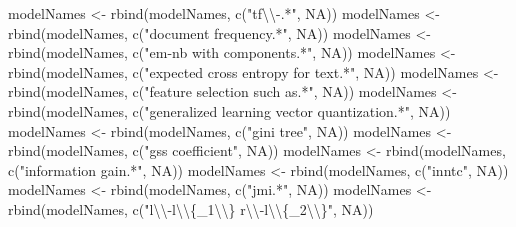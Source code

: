 \documentclass[
]{article}
\newenvironment{Shaded}{\begin{snugshade}}{\end{snugshade}}
\newcommand{\ConstantTok}[1]{\textcolor[rgb]{0.00,0.00,0.00}{#1}}
\newcommand{\FunctionTok}[1]{\textcolor[rgb]{0.00,0.00,0.00}{#1}}
\newcommand{\NormalTok}[1]{#1}
\newcommand{\OtherTok}[1]{\textcolor[rgb]{0.56,0.35,0.01}{#1}}
\newcommand{\SpecialCharTok}[1]{\textcolor[rgb]{0.00,0.00,0.00}{#1}}
\newcommand{\StringTok}[1]{\textcolor[rgb]{0.31,0.60,0.02}{#1}}
\begin{document}
\begin{Shaded}
\begin{Highlighting}[]
\NormalTok{modelNames }\OtherTok{\textless{}{-}} \FunctionTok{rbind}\NormalTok{(modelNames, }\FunctionTok{c}\NormalTok{(}\StringTok{"tf}\SpecialCharTok{\textbackslash{}\textbackslash{}}\StringTok{{-}.*"}\NormalTok{, }\ConstantTok{NA}\NormalTok{))}
\NormalTok{modelNames }\OtherTok{\textless{}{-}} \FunctionTok{rbind}\NormalTok{(modelNames, }\FunctionTok{c}\NormalTok{(}\StringTok{"document frequency.*"}\NormalTok{, }\ConstantTok{NA}\NormalTok{))}
\NormalTok{modelNames }\OtherTok{\textless{}{-}} \FunctionTok{rbind}\NormalTok{(modelNames, }\FunctionTok{c}\NormalTok{(}\StringTok{"em{-}nb with components.*"}\NormalTok{, }\ConstantTok{NA}\NormalTok{))}
\NormalTok{modelNames }\OtherTok{\textless{}{-}} \FunctionTok{rbind}\NormalTok{(modelNames, }\FunctionTok{c}\NormalTok{(}\StringTok{"expected cross entropy for text.*"}\NormalTok{, }\ConstantTok{NA}\NormalTok{))}
\NormalTok{modelNames }\OtherTok{\textless{}{-}} \FunctionTok{rbind}\NormalTok{(modelNames, }\FunctionTok{c}\NormalTok{(}\StringTok{"feature selection such as.*"}\NormalTok{, }\ConstantTok{NA}\NormalTok{))}
\NormalTok{modelNames }\OtherTok{\textless{}{-}} \FunctionTok{rbind}\NormalTok{(modelNames, }\FunctionTok{c}\NormalTok{(}\StringTok{"generalized learning vector quantization.*"}\NormalTok{, }\ConstantTok{NA}\NormalTok{))}
\NormalTok{modelNames }\OtherTok{\textless{}{-}} \FunctionTok{rbind}\NormalTok{(modelNames, }\FunctionTok{c}\NormalTok{(}\StringTok{"gini tree"}\NormalTok{, }\ConstantTok{NA}\NormalTok{))}
\NormalTok{modelNames }\OtherTok{\textless{}{-}} \FunctionTok{rbind}\NormalTok{(modelNames, }\FunctionTok{c}\NormalTok{(}\StringTok{"gss coefficient"}\NormalTok{, }\ConstantTok{NA}\NormalTok{))}
\NormalTok{modelNames }\OtherTok{\textless{}{-}} \FunctionTok{rbind}\NormalTok{(modelNames, }\FunctionTok{c}\NormalTok{(}\StringTok{"information gain.*"}\NormalTok{, }\ConstantTok{NA}\NormalTok{))}
\NormalTok{modelNames }\OtherTok{\textless{}{-}} \FunctionTok{rbind}\NormalTok{(modelNames, }\FunctionTok{c}\NormalTok{(}\StringTok{"inntc"}\NormalTok{, }\ConstantTok{NA}\NormalTok{))}
\NormalTok{modelNames }\OtherTok{\textless{}{-}} \FunctionTok{rbind}\NormalTok{(modelNames, }\FunctionTok{c}\NormalTok{(}\StringTok{"jmi.*"}\NormalTok{, }\ConstantTok{NA}\NormalTok{))}
\NormalTok{modelNames }\OtherTok{\textless{}{-}} \FunctionTok{rbind}\NormalTok{(modelNames, }\FunctionTok{c}\NormalTok{(}\StringTok{"l}\SpecialCharTok{\textbackslash{}\textbackslash{}}\StringTok{{-}l}\SpecialCharTok{\textbackslash{}\textbackslash{}}\StringTok{\{\_1}\SpecialCharTok{\textbackslash{}\textbackslash{}}\StringTok{\} r}\SpecialCharTok{\textbackslash{}\textbackslash{}}\StringTok{{-}l}\SpecialCharTok{\textbackslash{}\textbackslash{}}\StringTok{\{\_2}\SpecialCharTok{\textbackslash{}\textbackslash{}}\StringTok{\}"}\NormalTok{, }\ConstantTok{NA}\NormalTok{))}

\end{Highlighting}
\end{Shaded}
\end{document}
